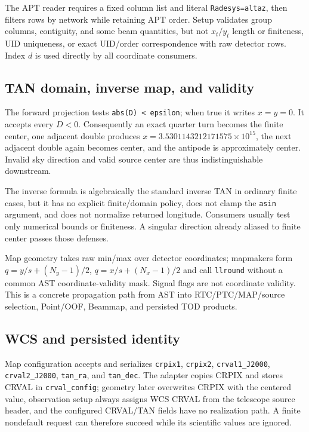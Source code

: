 \documentclass[11pt]{article}
\newcommand{\code}[1]{\nolinkurl{#1}}
\begin{document}
The APT reader requires a fixed column list and literal \code{Radesys=altaz},
then filters rows by network while retaining APT order. Setup validates group
columns, contiguity, and some beam quantities, but not $x_t/y_t$ length or
finiteness, UID uniqueness, or exact UID/order correspondence with raw detector
rows. Index $d$ is used directly by all coordinate consumers.

\subsection{TAN domain, inverse map, and validity}

The forward projection tests \code{abs(D) < epsilon}; when true it writes
$x=y=0$. It accepts every $D<0$. Consequently an exact quarter turn becomes
the finite center, one adjacent double produces $x=3.5301143212171575\times
10^{15}$, the next adjacent double again becomes center, and the antipode is
approximately center. Invalid sky direction and valid source center are thus
indistinguishable downstream.

The inverse formula is algebraically the standard inverse TAN in ordinary
finite cases, but it has no explicit finite/domain policy, does not clamp the
\code{asin} argument, and does not normalize returned longitude. Consumers
usually test only numerical bounds or finiteness. A singular direction already
aliased to finite center passes those defenses.

Map geometry takes raw min/max over detector coordinates; mapmakers form
$q=y/s+(N_y-1)/2$, $q=x/s+(N_x-1)/2$ and call \code{llround} without a common
AST coordinate-validity mask. Signal flags are not coordinate validity. This
is a concrete propagation path from AST into RTC/PTC/MAP/source selection,
Point/OOF, Beammap, and persisted TOD products.

\subsection{WCS and persisted identity}

Map configuration accepts and serializes \code{crpix1}, \code{crpix2},
\code{crval1_J2000}, \code{crval2_J2000}, \code{tan_ra}, and
\code{tan_dec}. The adapter copies CRPIX and stores CRVAL in
\code{crval_config}; geometry later overwrites CRPIX with the centered value,
observation setup always assigns WCS CRVAL from the telescope source header,
and the configured CRVAL/TAN fields have no realization path. A finite
nondefault request can therefore succeed while its scientific values are
ignored.
\end{document}
